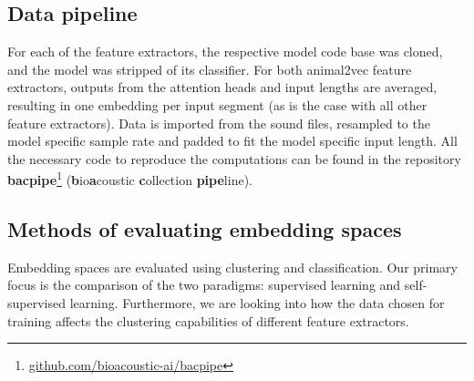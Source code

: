


\subsection{Data pipeline}
\label{ssub:data_pipe}

For each of the feature extractors, the respective model code base was cloned, and the model was stripped of its classifier.
For both animal2vec feature extractors, outputs from the attention heads and input lengths are averaged, resulting in one embedding per input segment (as is the case with all other feature extractors).
Data is imported from the sound files, resampled to the model specific sample rate and padded to fit the model specific input length.
All the necessary code to reproduce the computations can be found in the repository \textbf{bacpipe}\footnote{\url{github.com/bioacoustic-ai/bacpipe}} (\textbf{b}io\textbf{a}coustic \textbf{c}ollection \textbf{pipe}line).

\subsection{Methods of evaluating embedding spaces}
\label{ssub:eval_dim_reduc}

Embedding spaces are evaluated using clustering and classification.
Our primary focus is the comparison of the two paradigms: supervised learning and self-supervised learning.
Furthermore, we are looking into how the data chosen for training affects the clustering capabilities of different feature extractors.



